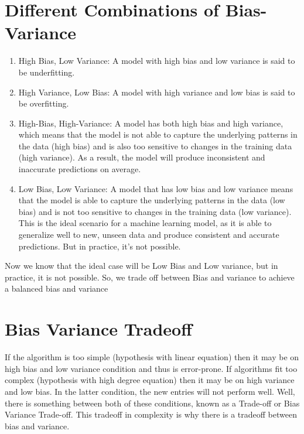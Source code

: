\section{Different Combinations of Bias-Variance}
    \begin{enumerate}
        \item High Bias, Low Variance: A model with high bias and low variance is said to be underfitting.
        \item High Variance, Low Bias: A model with high variance and low bias is said to be overfitting.
        \item High-Bias, High-Variance: A model has both high bias and high variance, which means that the model is not able to capture the underlying patterns in the data (high bias) and is also too sensitive to changes in the training data (high variance). As a result, the model will produce inconsistent and inaccurate predictions on average.
        \item Low Bias, Low Variance: A model that has low bias and low variance means that the model is able to capture the underlying patterns in the data (low bias) and is not too sensitive to changes in the training data (low variance). This is the ideal scenario for a machine learning model, as it is able to generalize well to new, unseen data and produce consistent and accurate predictions. But in practice, it’s not possible.
    \end{enumerate}

    Now we know that the ideal case will be Low Bias and Low variance, but in practice, it is not possible. So, we trade off between Bias and variance to achieve a balanced bias and variance

\section{Bias Variance Tradeoff}
    If the algorithm is too simple (hypothesis with linear equation) then it may be on high bias and low variance condition and thus is error-prone. If algorithms fit too complex (hypothesis with high degree equation) then it may be on high variance and low bias. In the latter condition, the new entries will not perform well. Well, there is something between both of these conditions, known as a Trade-off or Bias Variance Trade-off. This tradeoff in complexity is why there is a tradeoff between bias and variance.
